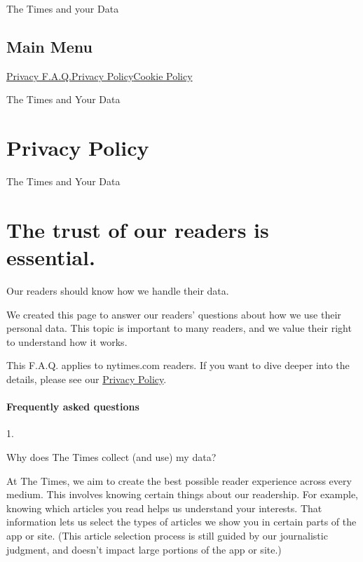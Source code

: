 The Times and your Data

\hypertarget{main-menu}{%
\subsection{Main Menu}\label{main-menu}}

\href{/privacy}{Privacy F.A.Q.}\href{/privacy/privacy-policy}{Privacy
Policy}\href{/privacy/cookie-policy}{Cookie Policy}

The Times and Your Data

\hypertarget{privacy-policy}{%
\section{Privacy Policy}\label{privacy-policy}}

The Times and Your Data

\hypertarget{the-trust-of-our-readers-is-essential}{%
\section{The trust of our readers is
essential.}\label{the-trust-of-our-readers-is-essential}}

Our readers should know how we handle their data.

We created this page to answer our readers' questions about how we use
their personal data. This topic is important to many readers, and we
value their right to understand how it works.

This F.A.Q. applies to nytimes.com readers. If you want to dive deeper
into the details, please see our \href{/privacy/privacy-policy}{Privacy
Policy}.

\hypertarget{frequently-asked-questions}{%
\paragraph{Frequently asked
questions}\label{frequently-asked-questions}}

1.

Why does The Times collect (and use) my data?

At The Times, we aim to create the best possible reader experience
across every medium. This involves knowing certain things about our
readership. For example, knowing which articles you read helps us
understand your interests. That information lets us select the types of
articles we show you in certain parts of the app or site. (This article
selection process is still guided by our journalistic judgment, and
doesn't impact large portions of the app or site.)

